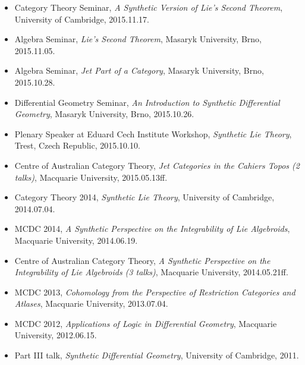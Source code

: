 \documentclass[10pt]{article}
\begin{document}
\begin{itemize}
    \item Category Theory Seminar, \emph{A Synthetic Version of Lie's Second Theorem}, University of Cambridge, 2015.11.17.
    \item Algebra Seminar, \emph{Lie's Second Theorem}, Masaryk University, Brno, 2015.11.05.
    \item Algebra Seminar, \emph{Jet Part of a Category}, Masaryk University, Brno, 2015.10.28.
    \item Differential Geometry Seminar, \emph{An Introduction to Synthetic Differential Geometry}, Masaryk University, Brno, 2015.10.26.
    \item Plenary Speaker at Eduard Cech Institute Workshop, \emph{Synthetic Lie Theory}, Trest, Czech Republic, 2015.10.10.
    \item Centre of Australian Category Theory, \emph{Jet Categories in the Cahiers Topos (2 talks)}, Macquarie University, 2015.05.13ff.
    \item Category Theory 2014, \emph{Synthetic Lie Theory}, University of Cambridge, 2014.07.04.
    \item MCDC 2014, \emph{A Synthetic Perspective on the Integrability of Lie Algebroids}, Macquarie University, 2014.06.19.
    \item Centre of Australian Category Theory, \emph{A Synthetic Perspective on the Integrability of Lie Algebroids (3 talks)}, Macquarie University, 2014.05.21ff.
    \item MCDC 2013, \emph{Cohomology from the Perspective of Restriction Categories and Atlases}, Macquarie University, 2013.07.04.
    \item MCDC 2012, \emph{Applications of Logic in Differential Geometry}, Macquarie University, 2012.06.15.
    \item Part III talk, \emph{Synthetic Differential Geometry}, University of Cambridge, 2011.
\end{itemize}
\end{document}
